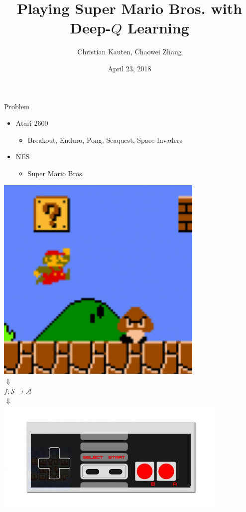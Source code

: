 \documentclass{beamer}
\title{Playing Super Mario Bros. with Deep-$Q$ Learning}
\author{Christian Kauten, Chaowei Zhang}
\institute{Auburn University}
\date{April 23, 2018}
\begin{document}
\frame{\titlepage}

\begin{frame}{Problem}
\begin{minipage}{\textwidth}
%
\begin{minipage}{0.5\textwidth}
\begin{itemize}
    \item{Atari 2600}
        \begin{itemize}
        \item{Breakout, Enduro, Pong, Seaquest, Space Invaders}
        \end{itemize}
    \item{NES}
        \begin{itemize}
        \item{Super Mario Bros.}
        \end{itemize}
\end{itemize}
\end{minipage}
%
\hfill
%
\begin{minipage}[t]{0.5\textwidth}
\centering
\includegraphics[width=0.75\textwidth]{img/smb} \\
$\Downarrow$ \\
$f : \mathcal{S} \to \mathcal{A}$ \\
$\Downarrow$ \\
\includegraphics[width=0.85\textwidth]{img/nes}
\end{minipage}
%
\end{minipage}
\end{frame}
\end{document}
